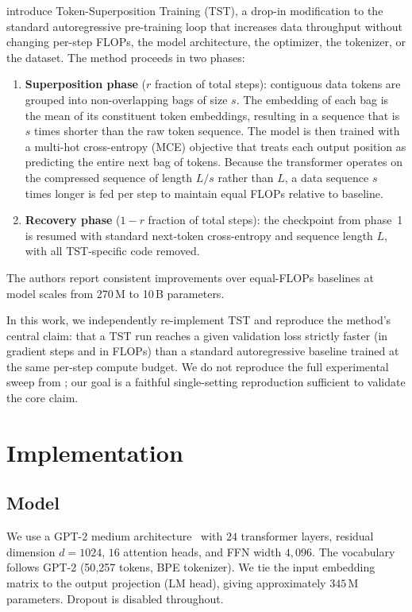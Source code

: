 \documentclass{article}
\begin{document}
\citet{peng2026efficient} introduce Token-Superposition Training (TST), a
drop-in modification to the standard autoregressive pre-training loop that
increases data throughput without changing per-step FLOPs, the model architecture,
the optimizer, the tokenizer, or the dataset.
The method proceeds in two phases:
\begin{enumerate}
    \item \textbf{Superposition phase} ($r$ fraction of total steps): contiguous
    data tokens are grouped into non-overlapping bags of size $s$.
    The embedding of each bag is the mean of its constituent token embeddings,
    resulting in a sequence that is $s$ times shorter than the raw token sequence.
    The model is then trained with a multi-hot cross-entropy (MCE) objective that
    treats each output position as predicting the entire next bag of tokens.
    Because the transformer operates on the compressed sequence of length $L/s$
    rather than $L$, a data sequence $s$ times longer is fed per step to maintain
    equal FLOPs relative to baseline.
    \item \textbf{Recovery phase} ($1-r$ fraction of total steps): the checkpoint
    from phase~1 is resumed with standard next-token cross-entropy and sequence length
    $L$, with all TST-specific code removed.
\end{enumerate}
The authors report consistent improvements over equal-FLOPs baselines at model
scales from 270\,M to 10\,B parameters.

In this work, we independently re-implement TST and reproduce the method's central
claim: that a TST run reaches a given validation loss strictly faster (in gradient
steps and in FLOPs) than a standard autoregressive baseline trained at the same
per-step compute budget.
We do not reproduce the full experimental sweep from \citet{peng2026efficient}; our
goal is a faithful single-setting reproduction sufficient to validate the core claim.

\section{Implementation}

\subsection{Model}

We use a GPT-2 medium architecture~\citep{radford2019language}
with $24$ transformer layers, residual dimension $d=1024$, $16$ attention heads,
and FFN width $4{,}096$.
The vocabulary follows GPT-2 (50{,}257 tokens, BPE tokenizer).
We tie the input embedding matrix to the output projection (LM head),
giving approximately $345$\,M parameters.
Dropout is disabled throughout.
\end{document}
